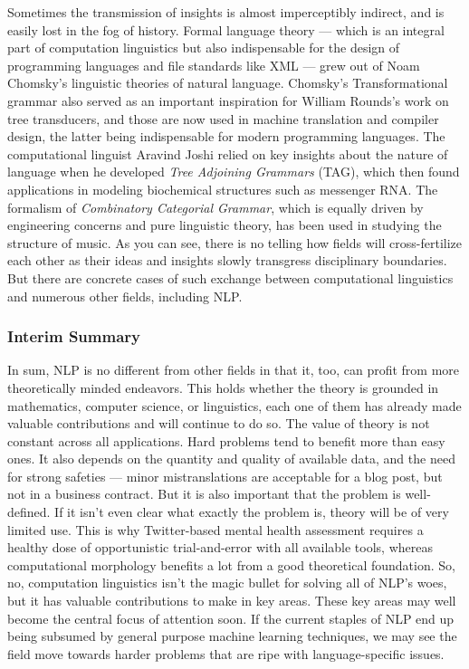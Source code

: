 Sometimes the transmission of insights is almost imperceptibly indirect, and is easily lost in the fog of history.
Formal language theory --- which is an integral part of computation linguistics but also indispensable for the design of programming languages and file standards like XML --- grew out of Noam Chomsky's linguistic theories of natural language.
Chomsky's Transformational grammar also served as an important inspiration for William Rounds's work on tree transducers, and those are now used in machine translation and compiler design, the latter being indispensable for modern programming languages.
The computational linguist Aravind Joshi relied on key insights about the nature of language when he developed \emph{Tree Adjoining Grammars} (TAG), which then found applications in modeling biochemical structures such as messenger RNA\@.
The formalism of \emph{Combinatory Categorial Grammar}, which is equally driven by engineering concerns and pure linguistic theory, has been used in studying the structure of music.
As you can see, there is no telling how fields will cross-fertilize each other as their ideas and insights slowly transgress disciplinary boundaries.
But there are concrete cases of such exchange between computational linguistics and numerous other fields, including NLP\@.

\subsubsection{Interim Summary}
\label{sub:formal_arguments_practical_summary}

In sum, NLP is no different from other fields in that it, too, can profit from more theoretically minded endeavors.
This holds whether the theory is grounded in mathematics, computer science, or linguistics, each one of them has already made valuable contributions and will continue to do so.
The value of theory is not constant across all applications.
Hard problems tend to benefit more than easy ones.
It also depends on the quantity and quality of available data, and the need for strong safeties --- minor mistranslations are acceptable for a blog post, but not in a business contract.
But it is also important that the problem is well-defined.
If it isn't even clear what exactly the problem is, theory will be of very limited use.
This is why Twitter-based mental health assessment requires a healthy dose of opportunistic trial-and-error with all available tools, whereas computational morphology benefits a lot from a good theoretical foundation.
So, no, computation linguistics isn't the magic bullet for solving all of NLP's woes, but it has valuable contributions to make in key areas.
These key areas may well become the central focus of attention soon.
If the current staples of NLP end up being subsumed by general purpose machine learning techniques, we may see the field move towards harder problems that are ripe with language-specific issues.

